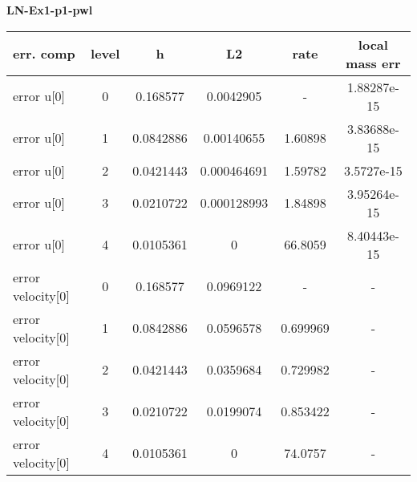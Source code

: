 \documentclass{amsart}
\begin{document}
\begin{center}   
{\bf LN-Ex1-p1-pwl }\end{center}  
\tableofcontents

\begin{table}[h!]
\begin{tabular}{|l|c|c|c|c|c|}
\hline
err. comp & level & h  & L2 & rate  & local mass err \\ 
\hline
error u[0] & 0 & 0.168577  & 0.0042905   & -   &  1.88287e-15 \\ 
error u[0] & 1 & 0.0842886 & 0.00140655  & 1.60898   &  3.83688e-15 \\ 
error u[0] & 2 & 0.0421443 & 0.000464691 & 1.59782   &  3.5727e-15 \\ 
error u[0] & 3 & 0.0210722 & 0.000128993 & 1.84898   &  3.95264e-15 \\ 
error u[0] & 4 & 0.0105361 & 0 & 66.8059   &  8.40443e-15 \\ 
error velocity[0] & 0 & 0.168577  & 0.0969122 & -   & - \\ 
error velocity[0] & 1 & 0.0842886 & 0.0596578 & 0.699969   & - \\ 
error velocity[0] & 2 & 0.0421443 & 0.0359684 & 0.729982   & - \\ 
error velocity[0] & 3 & 0.0210722 & 0.0199074 & 0.853422   & - \\ 
error velocity[0] & 4 & 0.0105361 & 0 & 74.0757   & - \\ 

\hline
\end{tabular}
\end{table}
\end{document}
